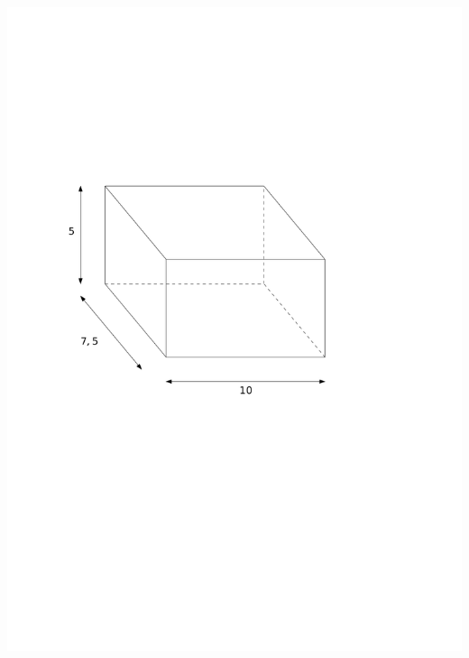 \documentclass[a4paper,11pt]{report}
\begin{document}
\begin{exo}
{\begin{tasks}[after-item-skip = 0em]
    \task ~\\ \includegraphics[scale=0.5]{media/gm-02/pave3.pdf}

\end{tasks}}
\end{exo}
\end{document}
